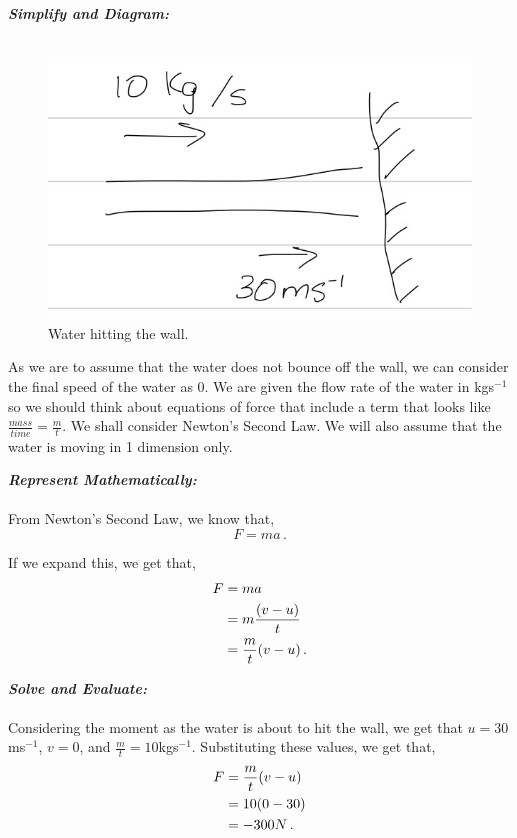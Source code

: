 \begin{subquestions}
\textbf{\textit{Simplify and Diagram:}} \\ \\
\begin{figure}[H]
	\begin{center}
		\includegraphics[scale=0.25]{../2015/figures/2015q6-1}
		\caption{\label{2015:q6:fig:Diagram1} Water hitting the wall.}
	\end{center}
\end{figure}	
As we are to assume that the water does not bounce off the wall, we can consider the final speed of the water as 0. We are given the flow rate of the water in kgs$^{-1}$ so we should think about equations of force that include a term that looks like $\frac{mass}{time}=\frac{m}{t}$. We shall consider Newton's Second Law. We will also assume that the water is moving in 1 dimension only.
	
	
	
	
\textbf{\textit{Represent Mathematically:}} \\ \\
From Newton's Second Law, we know that,
\begin{equation}
	F=ma \,.
\end{equation}
	
If we expand this, we get that,
\begin{align}
	F & = ma \nonumber \\
	  & = m\frac{(v-u)}{t} \nonumber \\
	  & = \frac{m}{t}(v-u) \,.
\end{align}
	
	
	
	
\textbf{\textit{Solve and Evaluate:}} \\ \\
Considering the moment as the water is about to hit the wall, we get that $u=30$ms$^{-1}$, $v=0$, and $\frac{m}{t}=10$kgs$^{-1}$. Substituting these values, we get that,
\begin{align}
	F & = \frac{m}{t}(v-u) \nonumber \\
	  & = 10(0-30) \nonumber \\
	  & = -300N \,.
\end{align}	
	

\end{subquestions}
